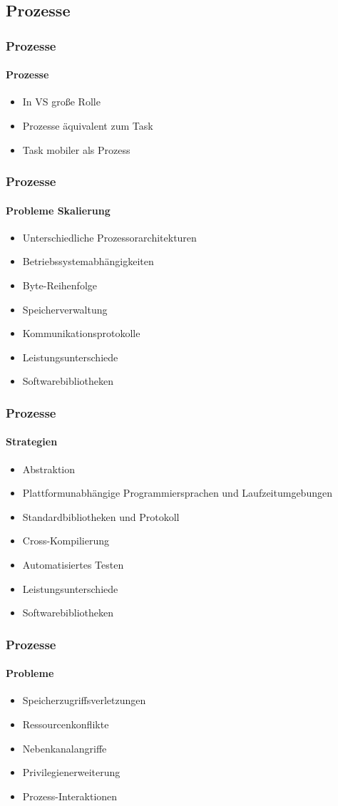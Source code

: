 
\subsection{Prozesse}
\begin{frame}
  \frametitle{Prozesse}
  \framesubtitle{Prozesse}
  \begin{itemize}
    \item In VS große Rolle
    \item Prozesse äquivalent zum Task
    \item Task mobiler als Prozess
  \end{itemize}
\end{frame}

\begin{frame}
  \frametitle{Prozesse}
  \framesubtitle{Probleme Skalierung}
  \begin{itemize}
    \item Unterschiedliche Prozessorarchitekturen
    \item Betriebssystemabhängigkeiten
    \item Byte-Reihenfolge 
    \item Speicherverwaltung
    \item Kommunikationsprotokolle
    \item Leistungsunterschiede
    \item Softwarebibliotheken
  \end{itemize}
\end{frame}

\begin{frame}
  \frametitle{Prozesse}
  \framesubtitle{Strategien}
  \begin{itemize}
    \item Abstraktion
    \item Plattformunabhängige Programmiersprachen und Laufzeitumgebungen
    \item Standardbibliotheken und Protokoll
    \item Cross-Kompilierung
    \item Automatisiertes Testen
    \item Leistungsunterschiede
    \item Softwarebibliotheken
  \end{itemize}
\end{frame}

\begin{frame}
  \frametitle{Prozesse}
  \framesubtitle{Probleme}
  \begin{itemize}
    \item Speicherzugriffsverletzungen
    \item Ressourcenkonflikte
    \item Nebenkanalangriffe
    \item Privilegienerweiterung
    \item Prozess-Interaktionen
  \end{itemize}
\end{frame}


